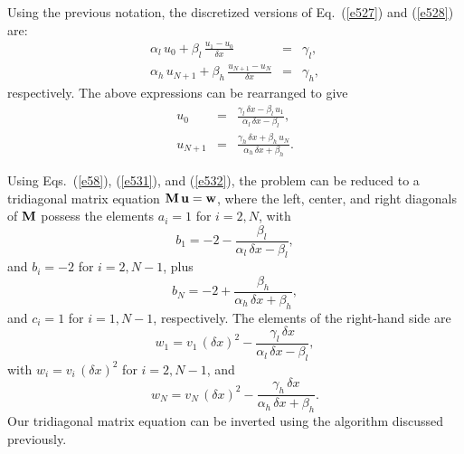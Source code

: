 Using the previous notation, the discretized versions of Eq.~(\ref{e527}) and (\ref{e528}) are:
\begin{eqnarray}\label{e529}
\alpha_l\,u_0 + \beta_l\,\frac{u_1-u_0}{\delta x} &=& \gamma_l,\\[0.5ex]
\alpha_h\,u_{N+1} + \beta_h\,\frac{u_{N+1}-u_N}{\delta x} &=& \gamma_h,\label{e530}
\end{eqnarray}
respectively.
The above expressions can be rearranged to give
\begin{eqnarray}\label{e531}
u_0 &=& \frac{\gamma_l\,\delta x-\beta_l\,u_1}{\alpha_l\,\delta x -\beta_l},\\[0.5ex]
u_{N+1} &=& \frac{\gamma_h\,\delta x + \beta_h\,u_N}{\alpha_h\,\delta x +\beta_h}.\label{e532}
\end{eqnarray}

Using Eqs.~(\ref{e58}), (\ref{e531}), and (\ref{e532}), the problem can be reduced to
a tridiagonal matrix equation ${\bf M}\,{\bf u} = {\bf w}$, where the left, center, and
right diagonals of ${\bf M}$ possess the elements $a_i = 1$ for $i=2,N$, with
\begin{equation}
b_1 = -2 - \frac{\beta_l}{\alpha_l\,\delta x-\beta_l},
\end{equation}
and $b_i=-2$ for $i=2,N-1$, plus
\begin{equation}
b_N = -2 + \frac{\beta_h}{\alpha_h\,\delta x+\beta_h},
\end{equation}
and $c_i = 1$ for $i=1,N-1$, respectively. The elements of the right-hand side
are
\begin{equation}
w_1 = v_1\,(\delta x)^2 - \frac{\gamma_l\,\delta x}{\alpha_l\,\delta x-\beta_l},
\end{equation}
with $w_i = v_i\,(\delta x)^2$ for $i=2,N-1$, and
\begin{equation}
w_N = v_N\,(\delta x)^2 - \frac{\gamma_h\,\delta x}{\alpha_h\,\delta x+\beta_h}.
\end{equation}
Our tridiagonal matrix equation can be inverted using the algorithm discussed 
previously.

